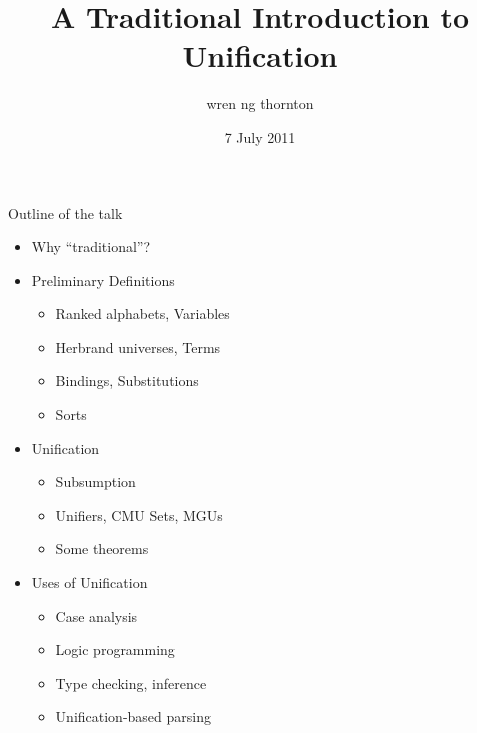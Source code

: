 \documentclass[pdf,fyma2]{prosper} %
\title{A Traditional Introduction to Unification}
\date{7 July 2011}
\author{wren ng thornton}
\newcommand{\hilighten}[1]{{\color{fymablue}#1}}
\begin{document}
\maketitle

\begin{slide}{Outline of the talk}
	\begin{itemize}
	\item Why ``traditional''?
	\item Preliminary Definitions
	    \begin{itemize}
    	\item \hilighten{Ranked alphabets, Variables}
    	\item \hilighten{Herbrand universes, Terms}
    	\item \hilighten{Bindings, Substitutions}
    	\item \hilighten{Sorts}
    	\end{itemize}
	\item Unification
	    \begin{itemize}
    	\item \hilighten{Subsumption}
    	\item \hilighten{Unifiers, CMU Sets, MGUs}
    	\item \hilighten{Some theorems}
    	\end{itemize}
	\item Uses of Unification
	    \begin{itemize}
    	\item \hilighten{Case analysis}
    	\item \hilighten{Logic programming}
    	\item \hilighten{Type checking, inference}
    	\item \hilighten{Unification-based parsing}
    	\end{itemize}
	\end{itemize}
\end{slide}
\end{document}
